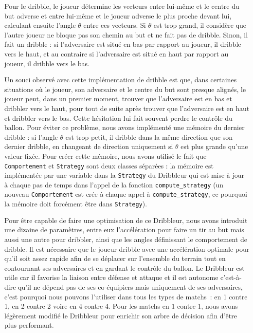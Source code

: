 \documentclass[a4paper,12pt]{article}
\begin{document}
Pour le dribble, le joueur détermine les vecteurs entre lui-même et le centre du but adverse et entre lui-même et le joueur adverse le plus proche devant lui, calculant ensuite l'angle $\theta$ entre ces vecteurs. Si $\theta$ est trop grand, il considère que l'autre joueur ne bloque pas son chemin au but et ne fait pas de dribble. Sinon, il fait un dribble : si l’adversaire est situé en bas par rapport au joueur, il dribble vers le haut, et au contraire si l’adversaire est situé en haut par rapport au joueur, il dribble vers le bas.
 
Un souci observé avec cette implémentation de dribble est que, dans certaines \mbox{situations} où le joueur, son adversaire et le centre du but sont presque alignés, le joueur peut, dans un premier moment, trouver que l'adversaire est en bas et dribbler vers le haut, pour tout de suite après trouver que l'adversaire est en haut et dribbler vers le bas. Cette hésitation lui fait souvent perdre le contrôle du ballon. Pour éviter ce problème, nous avons implémenté une mémoire du dernier dribble : si l'angle $\theta$ est trop petit, il dribble dans la même direction que son dernier dribble, en changeant de direction uniquement si $\theta$ est plus grande qu'une valeur fixée. Pour créer cette mémoire, nous avons utilisé le fait que \texttt{Comportement} et \texttt{Strategy} sont deux classes séparées : la mémoire est implémentée par une variable dans la \texttt{Strategy} du Dribbleur qui est mise à jour à chaque pas de temps dans l'appel de la fonction \texttt{compute\_strategy} (un nouveau \texttt{Comportement} est crée à chaque appel à \texttt{compute\_strategy}, ce pourquoi la mémoire doit forcément être dans \texttt{Strategy}).

Pour être capable de faire une optimisation de ce Dribbleur, nous avons introduit une dizaine de paramètres, entre eux l’accélération pour faire un tir au but mais aussi une autre pour dribbler, ainsi que les angles définissant le comportement de dribble. Il est nécessaire que le joueur dribble avec une accélération optimale pour qu’il soit assez rapide afin de se déplacer sur l’ensemble du terrain tout en contournant ses adversaires et en gardant le contrôle du ballon. Le Dribbleur est utile car il favorise la liaison entre défense et attaque et il est autonome c’est-à-dire qu’il ne dépend pas de ses co-équipiers mais uniquement de ses adversaires, c’est pourquoi nous pouvons l’utiliser dans tous les types de matchs : en 1 contre 1, en 2 contre 2 voire en 4 contre 4. Pour les matchs en 1 contre 1, nous avons légèrement modifié le Dribbleur pour enrichir son arbre de décision afin d'être plus performant.
\end{document}
